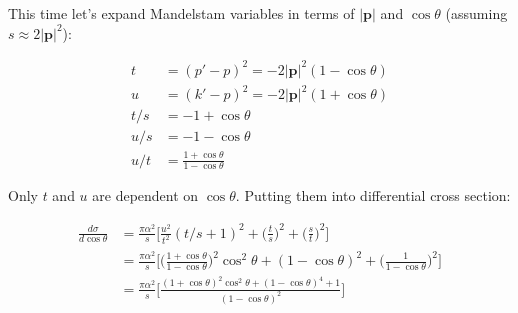 \documentclass[11pt]{article}
\begin{document}
This time let's expand Mandelstam variables in terms of $|\textbf{p}|$ and $\cos \theta$
(assuming $s \approx 2|\textbf{p}|^2$):

\begin{equation}
  \begin{split}
    t &= (p' - p)^2 = -2 |\textbf{p}|^2 ( 1 - \cos \theta ) \\
    u &= (k' - p)^2 = -2 |\textbf{p}|^2 ( 1 + \cos \theta ) \\
    t/s &= -1 + \cos \theta \\
    u/s &= -1 - \cos \theta \\
    u/t &= \frac{1 + \cos \theta} {1 - \cos \theta}
  \end{split}
\end{equation}

Only $t$ and $u$ are dependent on $\cos \theta$. Putting them into differential cross
section:

\begin{equation}
  \begin{split}
    \frac{d \sigma} {d \cos \theta} & = \frac{\pi \alpha^2} {s} \Bigg [
      \frac{u^2} {t^2} ( t/s + 1 )^2 +
      \Big ( \frac{t} {s} \Big )^2  +
      \Big ( \frac{s} {t} \Big )^2 \Bigg ] \\
    & = \frac{\pi \alpha^2} {s} \Bigg [
      \Big ( \frac{1 + \cos \theta} {1 - \cos \theta} \Big )^2 \cos^2 \theta +
      ( 1 - \cos \theta )^2  +
      \Big ( \frac{1} {1 - \cos \theta} \Big )^2 \Bigg ] \\
    & = \frac{\pi \alpha^2} {s} \Bigg [
      \frac{(1 + \cos \theta)^2 \cos^2 \theta +
               (1 - \cos \theta)^4 + 1} {(1 - \cos \theta)^2}
      \Bigg ]
  \end{split}
\end{equation}
\end{document}
